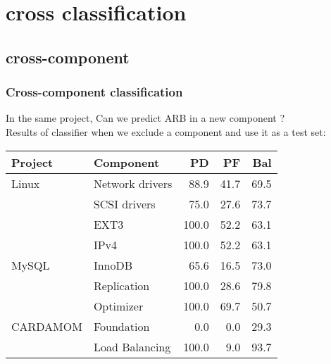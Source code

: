 \section{cross classification}

\subsection{cross-component}
\begin{frame}
 \frametitle{Cross-component classification}
 \alert{In the same project, Can we predict ARB in a new component ?}\\
 Results of classifier when we exclude a component and use it as a test set:
 \begin{center}
  \begin{tabular}{l l|r r r}
   Project & Component & PD & PF & Bal\\
   \hline
   Linux & Network drivers & 88.9 & 41.7 & 69.5\\
    & SCSI drivers & 75.0 & 27.6 & 73.7\\
    & EXT3 & 100.0 & 52.2 & 63.1\\
    & IPv4 & 100.0 & 52.2 & 63.1\\
   \hline
   MySQL & InnoDB & 65.6 & 16.5 & 73.0\\
    & Replication & 100.0 & 28.6 & 79.8\\
    & Optimizer & 100.0 & 69.7 & 50.7\\
   \hline
   CARDAMOM & Foundation & 0.0 & 0.0 & 29.3\\
    & Load Balancing & 100.0 & 9.0 & 93.7\\
   \hline
  \end{tabular}
 \end{center}
\end{frame}

